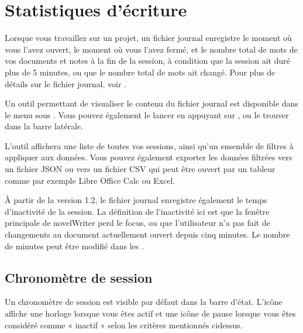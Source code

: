\documentclass[a4paper,11pt,french]{sphinxmanual}
\begin{document}
\section{Statistiques d’écriture}
\label{\detokenize{project_overview:writing-statistics}}\label{\detokenize{project_overview:a-proj-stats}}
\sphinxAtStartPar
Lorsque vous travaillez sur un projet, un fichier journal enregistre le moment où vous l’avez ouvert, le moment où vous l’avez fermé, et le nombre total de mots de vos documents et notes à la fin de la session, à condition que la session ait duré plus de 5 minutes, ou que le nombre total de mots ait changé. Pour plus de détails sur le fichier journal, voir {\hyperref[\detokenize{tech_storage:a-storage}]{}}.

\sphinxAtStartPar
Un outil permettant de visualiser le contenu du fichier journal est disponible dans le menu  sous . Vous pouvez également le lancer en appuyant sur , ou le trouver dans la barre latérale.

\sphinxAtStartPar
L’outil affichera une liste de toutes vos sessions, ainsi qu’un ensemble de filtres à appliquer aux données. Vous pouvez également exporter les données filtrées vers un fichier JSON ou vers un fichier CSV qui peut être ouvert par un tableur comme par exemple Libre Office Calc ou Excel.

\sphinxAtStartPar
{}À partir de la version 1.2, le fichier journal enregistre également le temps d’inactivité de la session. La définition de l’inactivité ici est que la fenêtre principale de novelWriter perd le focus, ou que l’utilisateur n’a pas fait de changements au document actuellement ouvert depuis cinq minutes. Le nombre de minutes peut être modifié dans les .


\subsection{Chronomètre de session}
\label{\detokenize{project_overview:session-timer}}
\sphinxAtStartPar
Un chronomètre de session est visible par défaut dans la barre d’état. L’icône affiche une horloge lorsque vous êtes actif et une icône de pause lorsque vous êtes considéré comme « inactif » selon les critères mentionnés ci\sphinxhyphen{}dessus.
\end{document}

